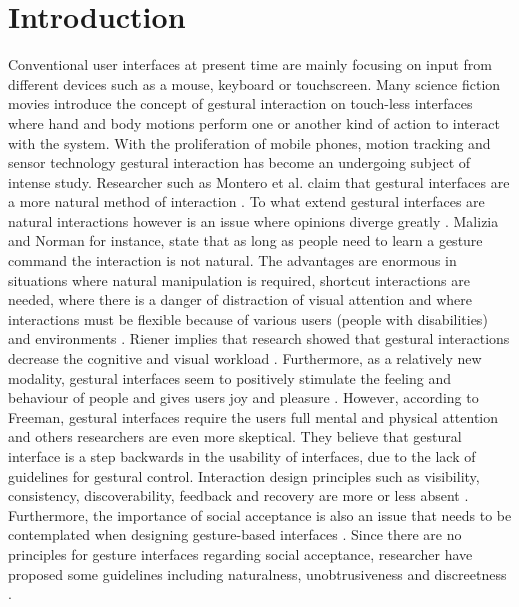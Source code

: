 \chapter{Introduction}
\label{chap:introduction}


Conventional user interfaces at present time are mainly focusing on input from different devices such as a mouse, keyboard or touchscreen. Many science fiction movies introduce the concept of gestural interaction on touch-less interfaces where hand and body motions perform one or another kind of action to interact with the system. With the proliferation of mobile phones, motion tracking and sensor technology gestural interaction has become an undergoing subject of intense study. Researcher such as Montero et al. claim that gestural interfaces are a more natural method of interaction \cite{Montero2010}. To what extend gestural interfaces are natural interactions however is an issue where opinions diverge greatly \cite{Norman2010}. Malizia and Norman \cite{Malizia2012, Norman2010} for instance, state that as long as people need to learn a gesture command the interaction is not natural. The advantages are enormous in situations where natural manipulation is required, shortcut interactions are needed, where there is a danger of distraction of visual attention and where interactions must be flexible because of various users (people with disabilities) and environments \cite{ParkWonkyu2014}. Riener implies that research showed that gestural interactions decrease the cognitive and visual workload \cite{Riener2012}. Furthermore, as a relatively new modality, gestural interfaces seem to positively stimulate the feeling and behaviour of people and gives users joy and pleasure \cite{Loehmann2013, RenGang2013}. However, according to Freeman, gestural interfaces require the users full mental and physical attention \cite{Freeman2012} and others researchers are even more skeptical. They believe that gestural interface is a step backwards in the usability of interfaces, due to the lack of guidelines for gestural control. Interaction design principles such as visibility, consistency, discoverability, feedback and recovery are more or less absent \cite{NormanNielsen2010}. Furthermore, the importance of social acceptance is also an issue that needs to be contemplated when designing gesture-based interfaces \cite{Montero2010}. Since there are no principles for gesture interfaces regarding social acceptance, researcher have proposed some guidelines including naturalness, unobtrusiveness and discreetness \cite{Montero2010}. 
\newline
